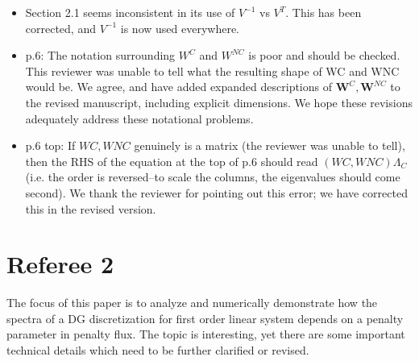 \documentclass[10pt]{article}
\newcommand{\note}[1]{{\color{blue}#1}}
\begin{document}
\begin{itemize}
\item Section 2.1 seems inconsistent in its use of $V^{-1}$ vs $V^T$.  \note{This has been corrected, and  $V^{-1}$ is now used everywhere.}
\item p.6: The notation surrounding $W^C$ and $W^{NC}$ is poor and should be checked.  This reviewer was unable to tell what the resulting shape of WC and WNC would be.
\note{We agree, and have added expanded descriptions of $\bm{W}^C, \bm{W}^{NC}$ to the revised manuscript, including explicit dimensions.  We hope these revisions adequately address these notational problems.}
\item p.6 top: If $WC, WNC$ genuinely is a matrix (the reviewer was unable to tell), then the RHS of the equation at the top of p.6 should read $(WC, WNC) \Lambda_C$ (i.e. the order is reversed--to scale the columns, the eigenvalues should come second).  
\note{We thank the reviewer for pointing out this error; we have corrected this in the revised version.}
\end{itemize}

\section{Referee 2}

The focus of this paper is to analyze and numerically demonstrate how the spectra of a DG discretization for first order linear system depends on a penalty parameter in penalty flux. The topic is interesting, yet there are some important technical details which need to be further clarified or revised.
\end{document}
